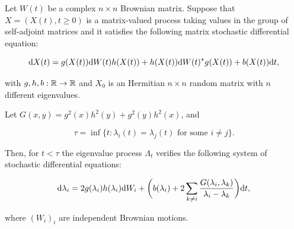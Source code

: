 \begin{theorem} \label{thm:diffusion_complejo}
    Let $W(t)$ be a complex $n\times n$ Brownian matrix. Suppose that $X = (X(t), t \ge 0)$ is a matrix-valued process taking values in the group of self-adjoint matrices and it satisfies the following matrix stochastic differential equation:

    \begin{equation}\label{eq:complex_diff}
        \mathrm d X(t) = g(X(t))\mathrm d  W(t) h(X(t)) + h(X(t))\mathrm d W(t)^* g(X(t)) + b(X(t))\mathrm d t,
    \end{equation}

    \noindent with $g,h,b: \mathbb R \to \mathbb R$ and $X_0$ is an Hermitian $n\times n$ random matrix with $n$ different eigenvalues.

    Let $G(x,y) = g^2(x)h^2(y) + g^2(y)h^2(x)$, and
    
    \[ \tau = \inf\{ t: \lambda_i(t) = \lambda_j(t) \text{ for some } i\neq j \}. \]
    
    Then, for $t < \tau$ the eigenvalue process $\Lambda_t$ verifies the following system of stochastic differential equations:

    \begin{equation}
        \mathrm d \lambda_i = 2g(\lambda_i)h(\lambda_i)\mathrm d W_i + \biggl( b(\lambda_i) + 2\sum_{k\neq i} \frac{G(\lambda_i,\lambda_k)}{\lambda_i - \lambda_k} \biggr)\mathrm d t,
    \end{equation}

    \noindent where $(W_i)_{i}$ are independent Brownian motions.
\end{theorem}

